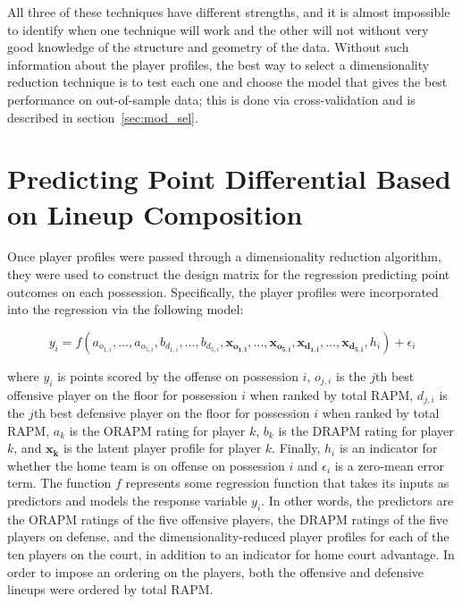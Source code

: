 All three of these techniques have different strengths, and it is almost impossible
to identify when one technique will work and the other will not without very good
knowledge of the structure and geometry of the data. Without such information about
the player profiles, the best way to select a dimensionality reduction technique is
to test each one and choose the model that gives the best performance on
out-of-sample data; this is done via cross-validation and is described in
section~\ref{sec:mod_sel}.

\section{Predicting Point Differential Based on Lineup Composition}
\label{sec:regress}

Once player profiles were passed through a dimensionality reduction algorithm, they
were used to construct the design matrix for the regression predicting point
outcomes on each possession. Specifically, the player profiles were incorporated
into the regression via the following model:

\begin{equation} \label{eq:model_spec}
    y_i = f\left( a_{o_{1,i}}, \dots, a_{o_{5,i}}, b_{d_{1,i}}, \dots, b_{d_{5,i}},
    \bm{x_{o_{1,i}}}, \dots, \bm{x_{o_{5,i}}}, \bm{x_{d_{1,i}}}, \dots,
    \bm{x_{d_{5,i}}}, h_i \right) + \epsilon_i
\end{equation}

where $y_i$ is points scored by the offense on possession $i$, $o_{j,i}$ is the
$j$th best offensive player on the floor for possession $i$ when ranked by total
RAPM, $d_{j,i}$ is the $j$th best defensive player on the floor for possession $i$
when ranked by total RAPM, $a_k$ is the ORAPM rating for player $k$, $b_k$ is the
DRAPM rating for player $k$, and $\bm{x_k}$ is the latent player profile for player
$k$. Finally, $h_i$ is an indicator for whether the home team is on offense on
possession $i$ and $\epsilon_i$ is a zero-mean error term. The function $f$
represents some regression function that takes its inputs as predictors and models
the response variable $y_i$. In other words, the predictors are the ORAPM ratings of
the five offensive players, the DRAPM ratings of the five players on defense, and
the dimensionality-reduced player profiles for each of the ten players on the court,
in addition to an indicator for home court advantage. In order to impose an ordering
on the players, both the offensive and defensive lineups were ordered by total RAPM.

